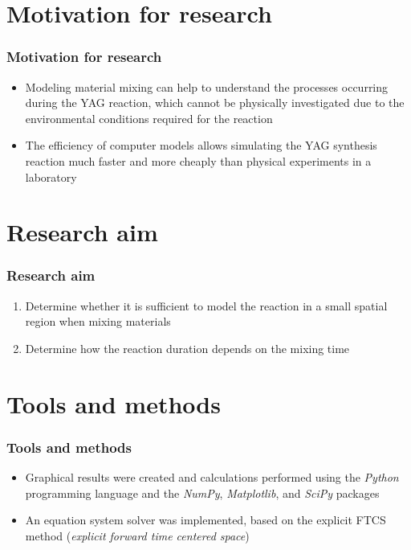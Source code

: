 \documentclass{beamer}
\begin{document}
\section{Motivation for research}

\begin{frame}
  \frametitle{Motivation for research}

  \begin{itemize}
    \item Modeling material mixing can help to understand the processes occurring during the YAG reaction, which cannot be physically investigated due to the environmental conditions required for the reaction
    \item The efficiency of computer models allows simulating the YAG synthesis reaction much faster and more cheaply than physical experiments in a laboratory
  \end{itemize}
\end{frame}

\section{Research aim}
\begin{frame}
  \frametitle{Research aim}

  \begin{enumerate}
    \item Determine whether it is sufficient to model the reaction in a small spatial region when mixing materials
    \item Determine how the reaction duration depends on the mixing time
  \end{enumerate}
\end{frame}

\section{Tools and methods}

\begin{frame}
  \frametitle{Tools and methods}
  \begin{itemize}
    \item Graphical results were created and calculations performed using the \textit{Python} programming language and the \textit{NumPy}, \textit{Matplotlib}, and \textit{SciPy} packages
    \item An equation system solver was implemented, based on the explicit FTCS method (\textit{explicit forward time centered space})
  \end{itemize}
\end{frame}
\end{document}
